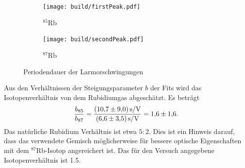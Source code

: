 \begin{figure}[h]
	\centering
	\begin{subfigure}[c]{0.45\textwidth}
	\begin{center}
		\texttt{[image: build/firstPeak.pdf]}
	\end{center}
	\caption{$^{85}$Rb}%
	\label{fig:}
	\end{subfigure}
	\begin{subfigure}[c]{0.45\textwidth}
	\begin{center}
	\texttt{[image: build/secondPeak.pdf]}
	\end{center}
	\caption{$^{87}$Rb}%
	\label{fig:}
	\end{subfigure}
	\caption{Periodendauer der Larmorschwingungen}%
	\label{fig:fitexp}
\end{figure}
Aus den Verhältnissen der Steigungsparameter $b$ der Fits wird das
Isotopenverhältnis von dem Rubidiumgas abgeschätzt.
Es beträgt
\begin{equation}
	\frac{b_{85}}{b_{87}} =
	\frac{\SI{10.7+-9.0}{\second\per\volt}}{\SI{6.6+-3.5}{\second\per\volt}} =
	\num{1.6 +- 1.6}.
\end{equation}
Das natürliche Rubidium Verhältnis ist etwa $5:2$.
Dies ist ein Hinweis darauf, dass das verwendete Gemisch möglicherweise für
bessere optische Eigenschaften mit dem $^{87}$Rb-Isotop angereichert ist.
Das für den Versuch angegebene Isotopenverhältnis ist \num{1.5}.
